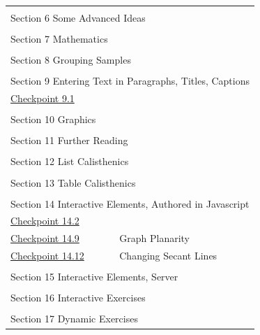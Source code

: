 \documentclass{sn-jnl}
\theoremstyle{thmstyleone}%
\theoremstyle{thmstyletwo}%
\theoremstyle{thmstylethree}%
\numberwithin{equation}{section}
\begin{document}
\begin{appendices}
\begin{longtable}[l]{ll}
\multicolumn{2}{l}{\null}\\[1.5ex] \multicolumn{2}{l}{\large Section 6 Some Advanced Ideas}\\[0.5ex]
\multicolumn{2}{l}{\null}\\[1.5ex] \multicolumn{2}{l}{\large Section 7 Mathematics}\\[0.5ex]
\multicolumn{2}{l}{\null}\\[1.5ex] \multicolumn{2}{l}{\large Section 8 Grouping Samples}\\[0.5ex]
\multicolumn{2}{l}{\null}\\[1.5ex] \multicolumn{2}{l}{\large Section 9 Entering Text in Paragraphs, Titles, Captions}\\[0.5ex]
\hyperref[subsection-xml-escape-7]{Checkpoint 9.1}& \\
\multicolumn{2}{l}{\null}\\[1.5ex] \multicolumn{2}{l}{\large Section 10 Graphics}\\[0.5ex]
\multicolumn{2}{l}{\null}\\[1.5ex] \multicolumn{2}{l}{\large Section 11 Further Reading}\\[0.5ex]
\multicolumn{2}{l}{\null}\\[1.5ex] \multicolumn{2}{l}{\large Section 12 List Calisthenics}\\[0.5ex]
\multicolumn{2}{l}{\null}\\[1.5ex] \multicolumn{2}{l}{\large Section 13 Table Calisthenics}\\[0.5ex]
\multicolumn{2}{l}{\null}\\[1.5ex] \multicolumn{2}{l}{\large Section 14 Interactive Elements, Authored in Javascript}\\[0.5ex]
\hyperref[interactive-html5-canvas-5]{Checkpoint 14.2}& \\
\hyperref[section-interactive-authored-8-10]{Checkpoint 14.9}& Graph Planarity\\
\hyperref[svg-interactives-5]{Checkpoint 14.12}& Changing Secant Lines\\
\multicolumn{2}{l}{\null}\\[1.5ex] \multicolumn{2}{l}{\large Section 15 Interactive Elements, Server}\\[0.5ex]
\multicolumn{2}{l}{\null}\\[1.5ex] \multicolumn{2}{l}{\large Section 16 Interactive Exercises}\\[0.5ex]
\multicolumn{2}{l}{\null}\\[1.5ex] \multicolumn{2}{l}{\large Section 17 Dynamic Exercises}\\[0.5ex]

\end{longtable}
\end{appendices}
\end{document}
